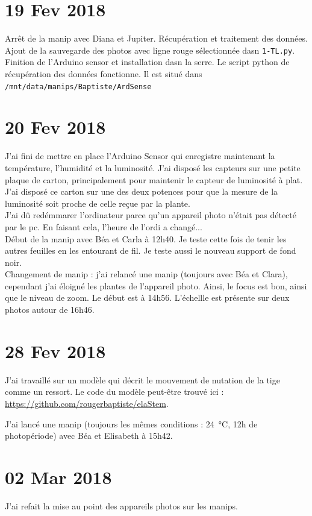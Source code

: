 \documentclass[10pt,a4paper]{article}
\begin{document}
\section{19 Fev 2018}
Arrêt de la manip avec Diana et Jupiter. Récupération et traitement des données.\\
Ajout de la sauvegarde des photos avec ligne rouge sélectionnée dasn \texttt{1-TL.py}.\\
Finition de l'Arduino sensor et installation dasn la serre. Le script python de récupération des données fonctionne. Il est situé dans \texttt{/mnt/data/manips/Baptiste/ArdSense}

\section{20 Fev 2018}
J'ai fini de mettre en place l'Arduino Sensor qui enregistre maintenant la température, l'humidité et la luminosité. J'ai disposé les capteurs sur une petite plaque de carton, principalement pour maintenir le capteur de luminosité à plat. J'ai disposé ce carton sur une des deux potences pour que la mesure de la luminosité soit proche de celle reçue par la plante.\\
J'ai dû redémmarer l'ordinateur parce qu'un appareil photo n'était pas détecté par le pc. En faisant cela, l'heure de l'ordi a changé...\\

Début de la manip avec Béa et Carla à 12h40. Je teste cette fois de tenir les autres feuilles en les entourant de fil. Je teste aussi le nouveau support de fond noir.\\

Changement de manip : j'ai relancé une manip (toujours avec Béa et Clara), cependant j'ai éloigné les plantes de l'appareil photo. Ainsi, le focus est bon, ainsi que le niveau de zoom. Le début est à 14h56. L'échellle est présente sur deux photos autour de 16h46.

\section{28 Fev 2018}
J'ai travaillé sur un modèle qui décrit le mouvement de nutation de la tige comme un ressort. Le code du modèle peut-être trouvé ici : \url{https://github.com/rougerbaptiste/elaStem}.

J'ai lancé une manip (toujours les mêmes conditions : \SI{24}{\celsius}, 12h de photopériode) avec Béa et Elisabeth à 15h42.


\section{02 Mar 2018}
J'ai refait la mise au point des appareils photos sur les manips.\\
\end{document}
